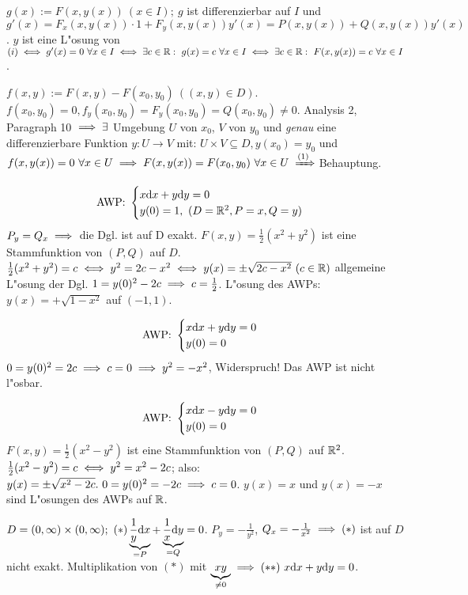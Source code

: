 \documentclass[a4paper,twoside,DIV15,BCOR12mm]{scrbook}
\begin{document}
\begin{beweise}
\item $g(x):=F(x, y(x))\ (x\in I);\ g$ ist differenzierbar auf $I$ und $g'(x)=F_x(x,y(x))\cdot 1+F_y(x,y(x))y'(x)=P(x,y(x))+Q(x,y(x))y'(x)$.
$y$ ist eine L"osung von $(i)\equizu g'(x)=0\ \forall x\in I\equizu\exists c\in\MdR:\ g(x)=c\ \forall x\in I\equizu\exists c\in\MdR:\ F(x,y(x))=c\ \forall x\in I$.
\item $f(x,y):=F(x,y)-F(x_0, y_0)\ ((x,y)\in D)$. $f(x_0, y_0)=0, f_y(x_0, y_0)=F_y(x_0,y_0)=Q(x_0,y_0)\ne 0$. Analysis 2, Paragraph 10 $\implies \exists$ Umgebung $U$
von $x_0$, $V$ von $y_0$ und \emph{genau} eine differenzierbare Funktion $y:U\to V$ mit: $U\times V\subseteq D, y(x_0)=y_0$ und $f(x,y(x))=0\ \forall x\in U\folgt F(x,y(x))=F(x_0, y_0)\ \forall x\in U\folgtnach{(1)}$Behauptung.
\end{beweise}

\begin{beispiele}
\item $$\text{AWP: }\begin{cases} x \mathrm{d} x + y\mathrm{d} y=0\\ y(0)=1,\ (D=\mathbb{R}^2, P=x, Q=y)\end{cases}$$
$P_y=Q_x\implies$ die Dgl. ist auf D exakt. $F(x,y)=\frac{1}{2}(x^2+y^2)$ ist eine Stammfunktion von $(P, Q)$ auf $D$. $\frac{1}{2}(x^2+y^2)=c\iff y^2=2c-x^2\iff y(x)=\pm \sqrt{2c-x^2}\ (c\in\mathbb{R})$ allgemeine L"osung der Dgl. $1=y(0)^2-2c\implies c=\frac{1}{2}$. L"osung des AWPs: $y(x)=+\sqrt{1-x^2}$ auf $(-1, 1)$.
\item $$\text{AWP: }\begin{cases}x\mathrm{d} x + y\mathrm{d} y=0\\ y(0)=0\end{cases}$$
$0=y(0)^2=2c\implies c=0\implies y^2=-x^2$, Widerspruch! Das AWP ist nicht l"osbar.
\item $$\text{AWP: }\begin{cases}x\mathrm{d} x - y\mathrm{d} y=0\\ y(0)=0\end{cases}$$
$F(x,y)=\frac{1}{2}(x^2-y^2)$ ist eine Stammfunktion von $(P, Q)$ auf $\mathbb{R}^2$. $\frac{1}{2}(x^2-y^2)=c\iff y^2=x^2-2c$; also: $y(x)=\pm\sqrt{x^2-2c}.\ 0=y(0)^2=-2c\folgt c=0$. $y(x)=x$ und $y(x)=-x$ sind L"osungen des AWPs auf $\mathbb{R}$.
\item $D=(0,\infty)\times(0,\infty);\ (*)\underbrace{\frac{1}{y}\ud x}_{=P}+\underbrace{\frac{1}{x}\ud y}_{=Q}=0$. $P_y=-\frac{1}{y^2}$, $Q_x=-\frac{1}{x^2}\implies (*)$ ist auf $D$ nicht exakt. Multiplikation von $(*)$ mit $\underbrace{xy}_{\ne 0}\implies (**)\ x\mathrm{d} x + y\mathrm{d} y=0$.
\end{beispiele}
\end{document}
